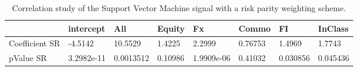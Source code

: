 \begin{table}[H]
\centering
\begin{tabular}{llllllll}
& intercept & All & Equity & Fx & Commo & FI & InClass \\ 
\hline 
Coefficient SR & -4.5142 & 10.5529 & 1.4225 & 2.2999 & 0.76753 & 1.4969 & 1.7743 \\ 
pValue SR & 3.2982e-11 & 0.0013512 & 0.10986 & 1.9909e-06 & 0.41032 & 0.030856 & 0.045436 \\ 
\hline
\end{tabular}
\caption{Correlation study of the Support Vector Machine signal with a risk parity weighting scheme.}
\label{SVM_RP_CORR}
\end{table}